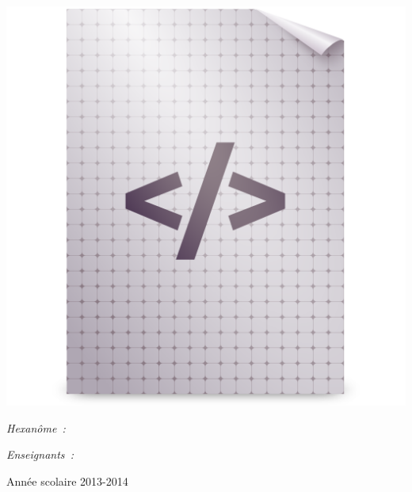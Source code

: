 \begin{center}
	\includegraphics [scale=0.35]{images/application-xml.png} \\[0.7cm]
	\begin{minipage}[t]{0.4\textwidth}
	  \begin{flushleft} \large
	    \emph{Hexanôme~:}\\
	    \small \reportauthor
	  \end{flushleft}
	\end{minipage}
	\begin{minipage}[t]{0.5\textwidth}
	  \begin{flushright} \large
	    \emph{Enseignants~:} \\
	    \enseignants
	  \end{flushright}
	\end{minipage}

	\vfill
	\footnotesize{Année scolaire 2013-2014}
\end{center}
